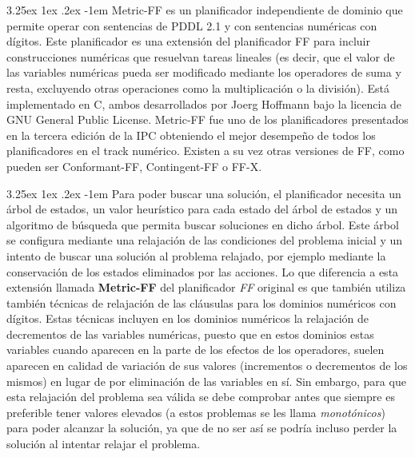 \documentclass{article}
\makeatletter
\renewcommand\paragraph{\@startsection{paragraph}{5}{\z@}%
  {3.25ex \@plus1ex \@minus.2ex}%
  {-1em}%
  {\normalfont\normalsize\bfseries}}
\makeatother
\begin{document}
\paragraph{}
Metric-FF\cite{mff} es un planificador independiente de dominio que permite operar con sentencias de PDDL 2.1 y con sentencias numéricas con dígitos. Este planificador es una extensión del planificador FF para incluir construcciones numéricas\cite{ff1} que resuelvan tareas lineales (es decir, que el valor de las variables numéricas pueda ser modificado mediante los operadores de suma y resta, excluyendo otras operaciones como la multiplicación o la división). Está implementado en C, ambos desarrollados por Joerg Hoffmann bajo la licencia de GNU General Public License. Metric-FF fue uno de los planificadores presentados en la tercera edición de la IPC obteniendo el mejor desempeño de todos los planificadores en el track numérico\cite{mffIPC3}. Existen a su vez otras versiones de FF, como pueden ser Conformant-FF, Contingent-FF\cite{conformant} o FF-X.

\paragraph{}
Para poder buscar una solución, el planificador necesita un árbol de estados, un valor heurístico para cada estado del árbol de estados y un algoritmo de búsqueda que permita buscar soluciones en dicho árbol. Este árbol se configura mediante una relajación de las condiciones del problema inicial y un intento de buscar una solución al problema relajado, por ejemplo mediante la conservación de los estados eliminados por las acciones. Lo que diferencia a esta extensión llamada \textbf{Metric-FF} del planificador \textit{FF} original es que también utiliza también técnicas de relajación de las cláusulas para los dominios numéricos con dígitos. Estas técnicas incluyen en los dominios numéricos la relajación de decrementos de las variables numéricas, puesto que en estos dominios estas variables cuando aparecen en la parte de los efectos de los operadores, suelen aparecen en calidad de variación de sus valores (incrementos o decrementos de los mismos) en lugar de por eliminación de las variables en sí. Sin embargo, para que esta relajación del problema sea válida se debe comprobar antes que siempre es preferible tener valores elevados (a estos problemas se les llama \textit{monotónicos}) para poder alcanzar la solución, ya que de no ser así se podría incluso perder la solución al intentar relajar el problema.
\end{document}
